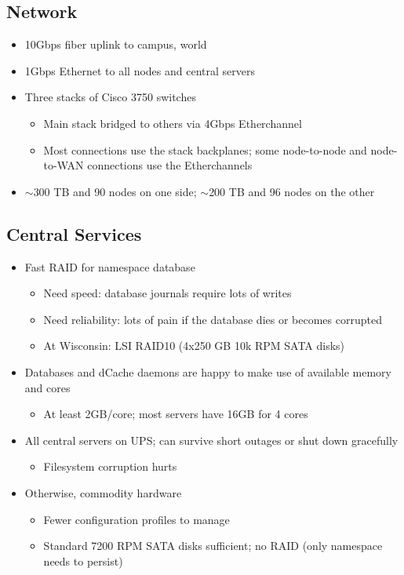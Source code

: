 \documentclass{beamer}
\newcommand{\ca}{\ensuremath{\sim}}
\begin{document}
\subsection{Network}
\begin{frame}
\begin{itemize}
	\item 10Gbps fiber uplink to campus, world
	\item 1Gbps Ethernet to all nodes and central servers
	\item Three stacks of Cisco 3750 switches
	\begin{itemize}
		\item Main stack bridged to others via 4Gbps Etherchannel
		\item Most connections use the stack backplanes; some node-to-node and node-to-WAN connections use the Etherchannels
	\end{itemize}
	\item \ca{}300 TB and 90 nodes on one side; \ca{}200 TB and 96 nodes on the other
\end{itemize}
\end{frame}

\subsection{Central Services}
\begin{frame}
\begin{itemize}
	\item Fast RAID for namespace database
	\begin{itemize}
		\item Need speed: database journals require lots of writes
		\item Need reliability: lots of pain if the database dies or becomes corrupted
		\item At Wisconsin: LSI RAID10 (4x250 GB 10k RPM SATA disks)
	\end{itemize}
	\item Databases and dCache daemons are happy to make use of available memory and cores
	\begin{itemize}
		\item At least 2GB/core; most servers have 16GB for 4 cores
	\end{itemize}
	\item All central servers on UPS; can survive short outages or shut down gracefully
	\begin{itemize}
		\item Filesystem corruption hurts
	\end{itemize}
	\item Otherwise, commodity hardware
	\begin{itemize}
		\item Fewer configuration profiles to manage
		\item Standard 7200 RPM SATA disks sufficient; no RAID (only namespace needs to persist)
	\end{itemize}
\end{itemize}
\end{frame}
\end{document}

